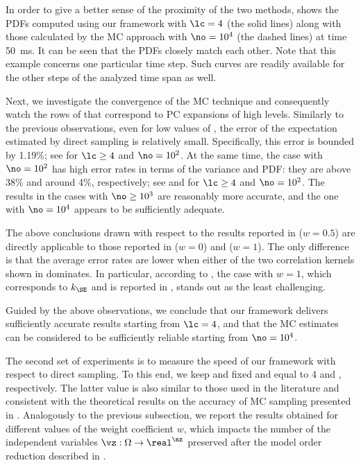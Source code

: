 In order to give a better sense of the proximity of the two methods,
 shows the \acp{PDF} computed using our
framework with $\lc = 4$ (the solid lines) along with those calculated by the
\ac{MC} approach with $\no = 10^4$ (the dashed lines) at time 50~ms. It can be
seen that the \acp{PDF} closely match each other. Note that this example
concerns one particular time step. Such curves are readily available for the
other steps of the analyzed time span as well.

Next, we investigate the convergence of the \ac{MC} technique and consequently
watch the rows of  that correspond to \ac{PC}
expansions of high levels. Similarly to the previous observations, even for low
values of \no, the error of the expectation estimated by direct sampling is
relatively small. Specifically, this error is bounded by 1.19\%; see
\error{\expectation} for $\lc \geq 4$ and $\no = 10^2$. At the same time, the
case with $\no = 10^2$ has high error rates in terms of the variance and
\ac{PDF}: they are above 38\% and around 4\%, respectively; see
\error{\variance} and  for $\lc \geq 4$ and $\no = 10^2$. The results
in the cases with $\no \geq 10^3$ are reasonably more accurate, and the one with
$\no = 10^4$ appears to be sufficiently adequate.

The above conclusions drawn with respect to the results reported in
 ($w = 0.5$) are directly applicable to those
reported in  ($w = 0$) and
 ($w = 1$). The only difference is that the
average error rates are lower when either of the two correlation kernels shown
in  dominates. In particular, according to
\error{\variance}, the case with $w = 1$, which corresponds to $k_\SE$ and is
reported in , stands out as the least
challenging.

Guided by the above observations, we conclude that our framework delivers
sufficiently accurate results starting from $\lc = 4$, and that the \ac{MC}
estimates can be considered to be sufficiently reliable starting from $\no =
10^4$.


The second set of experiments is to measure the speed of our framework with
respect to direct sampling. To this end, we keep \lc and \no fixed and equal to
4 and , respectively. The latter value is also similar to those
used in the literature \cite{ghanta2006, bhardwaj2008, huang2009a, shen2009,
xiang2010, juan2012, lee2013} and consistent with the theoretical results on the
accuracy of \ac{MC} sampling presented in \cite{diaz-emparanza2002}. Analogously
to the previous subsection, we report the results obtained for different values
of the weight coefficient $w$, which impacts the number of the independent
variables $\vz: \Omega \to \real^\nz$ preserved after the model order reduction
described in .

